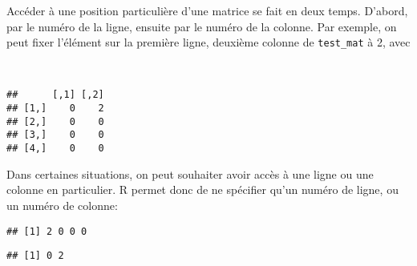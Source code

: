 Accéder à une position particulière d'une matrice se fait en deux temps.
D'abord, par le numéro de la ligne, ensuite par le numéro de la colonne.
Par exemple, on peut fixer l'élément sur la première ligne, deuxième colonne de \texttt{test\_mat} à 2, avec

\begin{knitrout}
\color{fgcolor}\begin{kframe}
\begin{flushleft}
\ttfamily\noindent
{}\hlkeyword{[}\hlkeyword{,}{\ }\hlkeyword{]}{\ }\hlassignement{\usebox{\hlnormalsizeboxlessthan}-}{\ }\hspace*{\fill}\\
\hlstd{}\mbox{}
\normalfont
\end{flushleft}
\begin{verbatim}
##      [,1] [,2]
## [1,]    0    2
## [2,]    0    0
## [3,]    0    0
## [4,]    0    0
\end{verbatim}
\end{kframe}
\end{knitrout}


Dans certaines situations, on peut souhaiter avoir accès à une ligne ou une colonne en particulier.
R permet donc de ne spécifier qu'un numéro de ligne, ou un numéro de colonne:

\begin{knitrout}
\color{fgcolor}\begin{kframe}
\begin{flushleft}
\ttfamily\noindent
{}\hlkeyword{[}\hlkeyword{,}{\ }\hlkeyword{]}\mbox{}
\normalfont
\end{flushleft}
\begin{verbatim}
## [1] 2 0 0 0
\end{verbatim}
\begin{flushleft}
\ttfamily\noindent
{}\hlkeyword{[}\hlkeyword{,}{\ }\hlkeyword{]}\mbox{}
\normalfont
\end{flushleft}
\begin{verbatim}
## [1] 0 2
\end{verbatim}
\end{kframe}
\end{knitrout}


